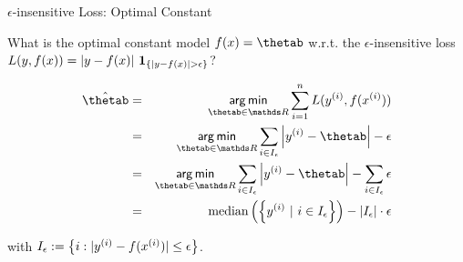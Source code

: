 \begin{vbframe}{$\epsilon$-insensitive Loss: Optimal Constant}

What is the optimal constant model $\fx = \thetab$ w.r.t. the $\epsilon$-insensitive loss $L(y, f(x)) =  |y - f(x)| ~ \mathbf{1}_{ \left\{|y - f(x)| > \epsilon \right\}}$?

\vspace{-0.2cm}
\begin{eqnarray*}
\hat \thetab&=& \argmin_{\thetab\in \R}\sumin \Lxyi \\
&=& \argmin_{\thetab\in \R} \sum_{i \in I_\eps} \left| \yi - \thetab \right| - \eps  \\
&=& \argmin_{\thetab\in \R} \sum_{i \in I_\eps} \left| \yi - \thetab \right| - \sum_{i \in I_\eps} \eps \\
&=& \text{median}\left(\left\{\yi ~|~ i \in I_\eps\right\}\right) - |I_\eps| \cdot \eps \\
\end{eqnarray*}

with $I_\epsilon := \left\{i: |y^{(i)} - f(x^{(i)})| \le \epsilon \right\}$.


% 
%   
% 

\end{vbframe}

